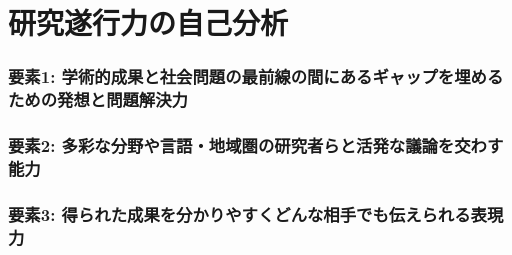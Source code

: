 
\section{研究遂行力の自己分析}

\noindent
{}

\vspace{5mm}
\noindent
{}
\subsubsection*{要素1: 学術的成果と社会問題の最前線の間にあるギャップを埋めるための発想と問題解決力}

\subsubsection*{要素2: 多彩な分野や言語・地域圏の研究者らと活発な議論を交わす能力}

\subsubsection*{要素3: 得られた成果を分かりやすくどんな相手でも伝えられる表現力}



